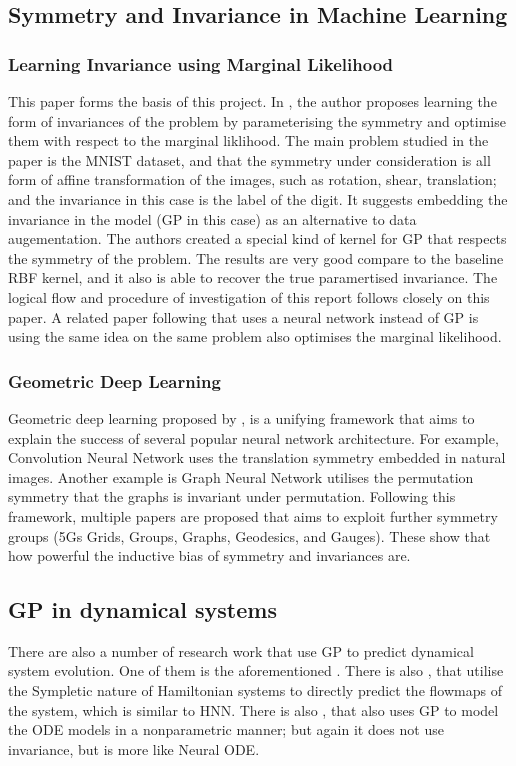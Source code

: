 \documentclass{statsmsc}
\begin{document}
\subsection{Symmetry and Invariance in Machine Learning}

\subsubsection{Learning Invariance using Marginal Likelihood}
This paper forms the basis of this project.
In \cite{Mark2017}, the author proposes learning the form of invariances of the problem by parameterising the symmetry and optimise them with respect to the marginal liklihood.
The main problem studied in the paper is the MNIST dataset, and that the symmetry under consideration is all form of affine transformation of the images, such as rotation, shear, translation; and the invariance in this case is the label of the digit. 
It suggests embedding the invariance in the model (GP in this case) as an alternative to data augementation.
The authors created a special kind of kernel for GP that respects the symmetry of the problem.
The results are very good compare to the baseline RBF kernel, and it also is able to recover the true paramertised invariance. 
The logical flow and procedure of investigation of this report follows closely on this paper. 
A related paper following that uses a neural network instead of GP is \cite{Tycho2021} using the same idea on the same problem also optimises the marginal likelihood.

\subsubsection{Geometric Deep Learning}
Geometric deep learning proposed by \cite{Bronstein2017}, is a unifying framework that aims to explain the success of several popular neural network architecture. 
For example, Convolution Neural Network uses the translation symmetry embedded in natural images. 
Another example is Graph Neural Network utilises the permutation symmetry that the graphs is invariant under permutation.
Following this framework, multiple papers are proposed that aims to exploit further symmetry groups (5Gs Grids, Groups, Graphs, Geodesics, and Gauges).
These show that how powerful the inductive bias of symmetry and invariances are.

\subsection{GP in dynamical systems}
There are also a number of research work that use GP to predict dynamical system evolution.
One of them is the aforementioned \cite{Raissi2018}.
There is also \cite{Rath2020}, that utilise the Sympletic nature of Hamiltonian systems to directly predict the flowmaps of the system, which is similar to HNN.
There is also \cite{Heinonen2018}, that also uses GP to model the ODE models in a nonparametric manner; but again it does not use invariance, but is more like Neural ODE. 
\end{document}
